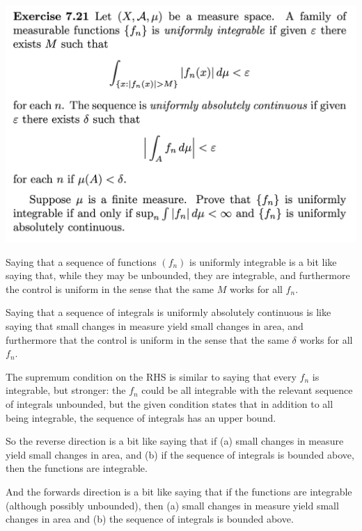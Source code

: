 \newpage
\begin{mdframed}
\includegraphics[width=400pt]{img/analysis--berkeley-202a-hw08-337f.png}
\end{mdframed}

\begin{intuition*}
  Saying that a sequence of functions $(f_n)$ is uniformly integrable is a bit like saying that, while they may
  be unbounded, they are integrable, and furthermore the control is uniform in the sense that the same $M$
  works for all $f_n$.

  Saying that a sequence of integrals is uniformly absolutely continuous is like saying that small changes in
  measure yield small changes in area, and furthermore that the control is uniform in the sense that the
  same $\delta$ works for all $f_n$.

  The supremum condition on the RHS is similar to saying that every $f_n$ is integrable, but stronger:
  the $f_n$ could be all integrable with the relevant sequence of integrals unbounded, but the given condition
  states that in addition to all being integrable, the sequence of integrals has an upper bound.

  So the reverse direction is a bit like saying that if (a) small changes in measure yield small changes in
  area, and (b) if the sequence of integrals is bounded above, then the functions are integrable.

  And the forwards direction is a bit like saying that if the functions are integrable (although possibly
  unbounded), then (a) small changes in measure yield small changes in area and (b) the sequence of integrals
  is bounded above.
\end{intuition*}


